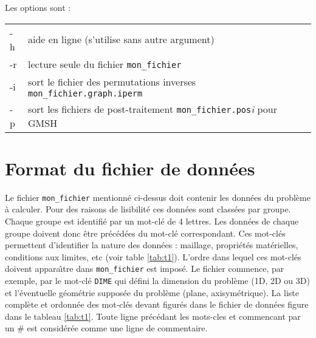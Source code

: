 \documentclass[a4paper,11pt]{article}
\begin{document}
Les options sont :

\begin{tabular}{ll}
-h & aide en ligne (s'utilise sans autre argument) \\
-r & lecture seule du fichier {\tt mon\_fichier} \\
-i & sort le fichier des permutations inverses {\tt mon\_fichier.graph.iperm} \\
-p & sort les fichiers de post-traitement {\tt mon\_fichier.pos}\textit{i} pour GMSH
\end{tabular}

\section{Format du fichier de donn\'ees}
Le fichier {\tt mon\_fichier} mentionn\'e ci-dessus doit contenir les donn\'ees du probl\`eme \`a calculer. Pour des raisons de lisibilit\'e ces donn\'ees sont class\'ees par groupe. Chaque groupe est identifi\'e par un mot-cl\'e de 4 lettres. Les donn\'ees de chaque groupe doivent donc \^etre pr\'ec\'ed\'ees du mot-cl\'e correspondant. Ces mot-cl\'es permettent d'identifier la nature des donn\'ees : maillage, propri\'et\'es mat\'erielles, conditions aux limites, etc (voir table \ref{tab:t1}). L'ordre dans lequel ces mot-cl\'es doivent appara\^{\i}tre dans {\tt mon\_fichier} est impos\'e. Le fichier commence, par exemple, par le mot-cl\'e {\tt DIME} qui d\'efini la dimension du probl\`eme (1D, 2D ou 3D) et l'\'eventuelle g\'eom\'etrie suppos\'ee du probl\`eme (plane, axisym\'etrique). La liste compl\`ete et ordonn\'ee des mot-cl\'es devant figur\'es dans le fichier de donn\'ees figure dans le tableau \ref{tab:t1}. Toute ligne pr\'ec\'edant les mots-cles et commencant par un \# est consid\'er\'ee comme une ligne de commentaire. 
\end{document}
